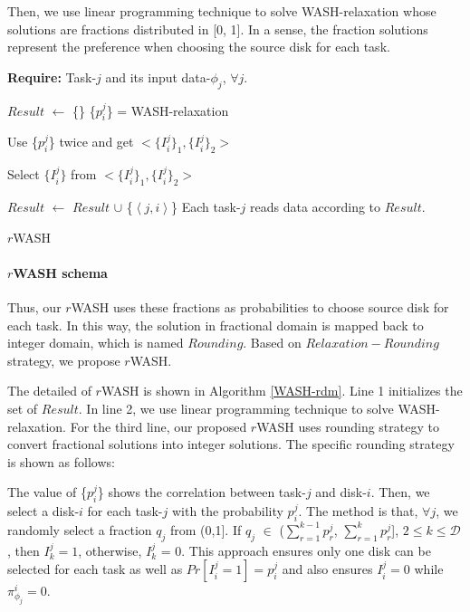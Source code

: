 \documentclass[conference]{IEEEtran}
\begin{document}
Then, we use linear programming technique to solve WASH-relaxation whose solutions are fractions distributed in [0, 1]. In a sense, the fraction solutions represent the preference when choosing the source disk for each task. 

 \begin{algorithm}[!t]
 	\textbf{Require:} Task-$j$ and its input data-$\phi_j$, $\forall j$. %
 	\begin{algorithmic}[1]	
 		\State $Result$ $\gets$ \{\}
 		\State \{$p_i^j$\} = WASH-relaxation		
 		
 		
 		\State Use \{$p_i^j$\} twice and get $<\{I_i^j\}_1, \{I_i^j\}_2 >$
 		
		\State Select $\{I_i^j\}$ from $<\{I_i^j\}_1, \{I_i^j\}_2>$


 			\State $Result$ $\gets$ $Result$ $\cup$ 	
 			\{$\left \langle j, i\right \rangle$\}
 			\EndIf
 		\EndFor	
 		\State Each task-$j$ reads data according to $Result$.
 	\end{algorithmic}
 	\caption{$r$WASH}\label{WASH-rdm}
 \end{algorithm}
 \paragraph{\textbf{$r$WASH schema}} 

Thus, our $r$WASH uses these fractions as probabilities to choose source disk for each task. In this way, the solution in fractional domain is mapped back to integer domain, which is named $Rounding$. 
Based on $Relaxation-Rounding$ strategy, we propose $r$WASH. 

The detailed of $r$WASH is shown in Algorithm \ref{WASH-rdm}. Line 1 initializes the set of $Result$. In line 2, we use linear programming technique to solve WASH-relaxation. For the third line, our proposed $r$WASH uses rounding strategy to convert fractional solutions into integer solutions. The specific rounding strategy is shown as follows:
 
The value of \{$p_i^j$\}  shows the correlation between task-$j$ and disk-$i$. Then, we select a disk-$i$ for each task-$j$ with the probability $p_i^j$. The method is that, $\forall j$, we randomly select a fraction $q_j$ from (0,1]. If $q_j$ $\in$ ($\sum\nolimits_{r = 1}^{k-1} p_{r}^{j}$,  $\sum\nolimits_{r = 1}^{k} p_{r}^{j}$], $2 \leq k \leq \mathcal{D} $, then $I_k^j = 1$, otherwise, $I_k^j$ = 0. This approach ensures only one disk can be selected for each task as well as $Pr[I_i^j = 1] = p_i^j$ and also ensures $I_i^j = 0$ while $\pi_{\phi_j}^i = 0$.
\end{document}
